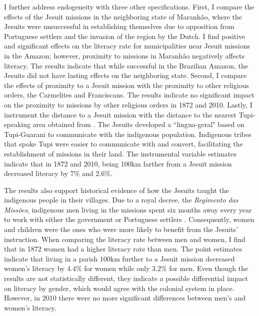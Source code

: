 \documentclass{article}
\begin{document}
I further address endogeneity with three other specifications. 
First, I compare the effects of the Jesuit missions in the neighboring state of Maranhão, where the Jesuits were unsuccessful in establishing themselves due to opposition from Portuguese settlers and the invasion of the region by the Dutch. 
I find positive and significant effects on the literacy rate for municipalities near Jesuit missions in the Amazon; however, proximity to missions in Maranhão negatively affects literacy. 
The results indicate that while successful in the Brazilian Amazon, the Jesuits did not have lasting effects on the neighboring state. 
Second, I compare the effects of proximity to a Jesuit mission with the proximity to other religious orders, the Carmelites and Franciscans. 
The results indicate no significant impact on the proximity to missions by other religious orders in 1872 and 2010.  
Lastly, I instrument the distance to a Jesuit mission with the distance to the nearest Tupi-speaking area obtained from \textcite{Clement2015-rf, Eriksen2011-cv}. 
The Jesuits developed a ``lingua-geral" based on Tupi-Guarani to communicate with the indigenous population. 
Indigenous tribes that spoke Tupi were easier to communicate with and convert, facilitating the establishment of missions in their land. 
The instrumental variable estimates indicate that in 1872 and 2010, being 100km farther from a Jesuit mission decreased literacy by 7\% and 2.6\%. 

The results also support historical evidence of how the Jesuits taught the indigenous people in their villages. 
Due to a royal decree, the \textit{Regimento das Missões}, indigenous men living in the missions spent six months away every year to work with either the government or Portuguese settlers \parencite{Hemming1987-vj}. 
Consequently, women and children were the ones who were more likely to benefit from the Jesuits' instruction. 
When comparing the literacy rate between men and women, I find that in 1872 women had a higher literacy rate than men. 
The point estimates indicate that living in a parish 100km further to a Jesuit mission decreased women's literacy by 4.4\% for women while only 3.2\% for men.
Even though the results are not statistically different, they indicate a possible differential impact on literacy by gender, which would agree with the colonial system in place. 
However, in 2010 there were no more significant differences between men's and women's literacy. 
\end{document}

